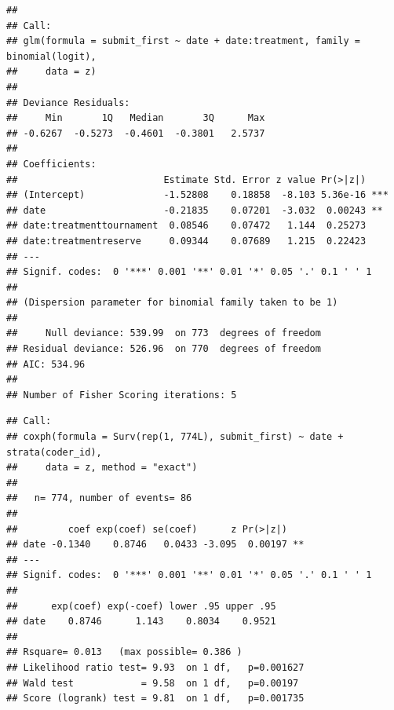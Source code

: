 \documentclass[]{article}
\newenvironment{Shaded}{\begin{snugshade}}{\end{snugshade}}
\newcommand{\KeywordTok}[1]{\textcolor[rgb]{0.13,0.29,0.53}{\textbf{#1}}}
\newcommand{\DataTypeTok}[1]{\textcolor[rgb]{0.13,0.29,0.53}{#1}}
\newcommand{\StringTok}[1]{\textcolor[rgb]{0.31,0.60,0.02}{#1}}
\newcommand{\CommentTok}[1]{\textcolor[rgb]{0.56,0.35,0.01}{\textit{#1}}}
\newcommand{\OperatorTok}[1]{\textcolor[rgb]{0.81,0.36,0.00}{\textbf{#1}}}
\newcommand{\NormalTok}[1]{#1}
\let\oldShaded\Shaded
\let\endoldShaded\endShaded
\renewenvironment{Shaded}{\footnotesize\oldShaded}{\endoldShaded}
\begin{document}
\begin{verbatim}
## 
## Call:
## glm(formula = submit_first ~ date + date:treatment, family = binomial(logit), 
##     data = z)
## 
## Deviance Residuals: 
##     Min       1Q   Median       3Q      Max  
## -0.6267  -0.5273  -0.4601  -0.3801   2.5737  
## 
## Coefficients:
##                          Estimate Std. Error z value Pr(>|z|)    
## (Intercept)              -1.52808    0.18858  -8.103 5.36e-16 ***
## date                     -0.21835    0.07201  -3.032  0.00243 ** 
## date:treatmenttournament  0.08546    0.07472   1.144  0.25273    
## date:treatmentreserve     0.09344    0.07689   1.215  0.22423    
## ---
## Signif. codes:  0 '***' 0.001 '**' 0.01 '*' 0.05 '.' 0.1 ' ' 1
## 
## (Dispersion parameter for binomial family taken to be 1)
## 
##     Null deviance: 539.99  on 773  degrees of freedom
## Residual deviance: 526.96  on 770  degrees of freedom
## AIC: 534.96
## 
## Number of Fisher Scoring iterations: 5
\end{verbatim}

\begin{Shaded}
\end{Shaded}

\begin{verbatim}
## Call:
## coxph(formula = Surv(rep(1, 774L), submit_first) ~ date + strata(coder_id), 
##     data = z, method = "exact")
## 
##   n= 774, number of events= 86 
## 
##         coef exp(coef) se(coef)      z Pr(>|z|)   
## date -0.1340    0.8746   0.0433 -3.095  0.00197 **
## ---
## Signif. codes:  0 '***' 0.001 '**' 0.01 '*' 0.05 '.' 0.1 ' ' 1
## 
##      exp(coef) exp(-coef) lower .95 upper .95
## date    0.8746      1.143    0.8034    0.9521
## 
## Rsquare= 0.013   (max possible= 0.386 )
## Likelihood ratio test= 9.93  on 1 df,   p=0.001627
## Wald test            = 9.58  on 1 df,   p=0.00197
## Score (logrank) test = 9.81  on 1 df,   p=0.001735
\end{verbatim}
\end{document}
